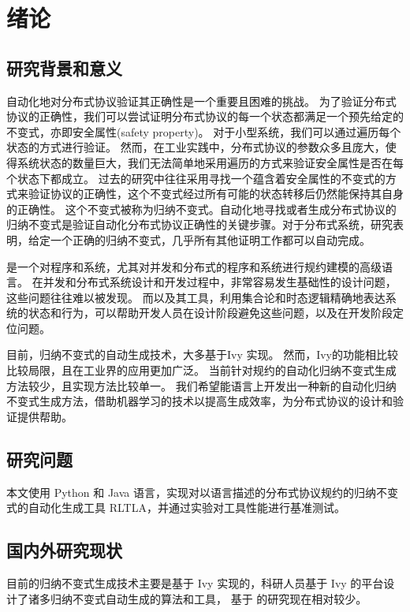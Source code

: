 \chapter{绪论}

\section{研究背景和意义}
自动化地对分布式协议验证其正确性是一个重要且困难的挑战。
为了验证分布式协议的正确性，我们可以尝试证明分布式协议的每一个状态都满足一个预先给定的不变式，亦即安全属性(safety property)。
对于小型系统，我们可以通过遍历每个状态的方式进行验证。
然而，在工业实践中，分布式协议的参数众多且庞大，使得系统状态的数量巨大，我们无法简单地采用遍历的方式来验证安全属性是否在每个状态下都成立。
过去的研究中往往采用寻找一个蕴含着安全属性的不变式的方式来验证协议的正确性，这个不变式经过所有可能的状态转移后仍然能保持其自身的正确性。
这个不变式被称为归纳不变式。自动化地寻找或者生成分布式协议的归纳不变式是验证自动化分布式协议正确性的关键步骤。对于分布式系统，研究表明，给定一个正确的归纳不变式，几乎所有其他证明工作都可以自动完成。

\TLA \cite{TLA+}是一个对程序和系统，尤其对并发和分布式的程序和系统进行规约建模的高级语言。
在并发和分布式系统设计和开发过程中，非常容易发生基础性的设计问题，这些问题往往难以被发现。
而\TLA 以及其工具，利用集合论和时态逻辑精确地表达系统的状态和行为，可以帮助开发人员在设计阶段避免这些问题，以及在开发阶段定位问题。

目前，归纳不变式的自动生成技术，大多基于Ivy \cite{Ivy} 实现。
然而，Ivy的功能相比较\TLA 比较局限，且\TLA 在工业界的应用更加广泛。
当前针对\TLA 规约的自动化归纳不变式生成方法较少，且实现方法比较单一。
我们希望能\TLA 语言上开发出一种新的自动化归纳不变式生成方法，借助机器学习的技术以提高生成效率，为分布式协议的设计和验证提供帮助。

\section{研究问题}
本文使用 Python 和 Java 语言，实现对以\TLA 语言描述的分布式协议规约的归纳不变式的自动化生成工具 RLTLA，并通过实验对工具性能进行基准测试。

\section{国内外研究现状}
目前的归纳不变式生成技术主要是基于 Ivy \cite{Ivy} 实现的，科研人员基于 Ivy 的平台设计了诸多归纳不变式自动生成的算法和工具，
基于 \TLA 的研究现在相对较少。

